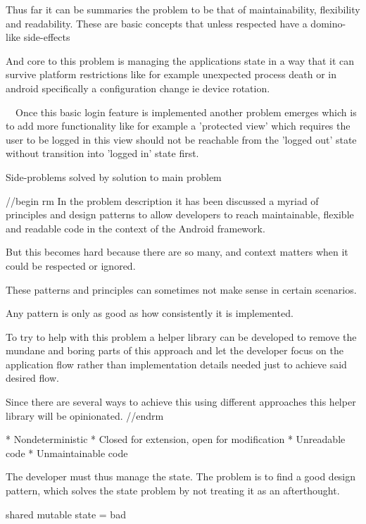 Thus far it can be summaries the problem to be that of maintainability, flexibility and readability.
These are basic concepts that unless respected have a domino-like side-effects 

And core to this problem is managing the applications state in a way that it can survive platform
restrictions like for example unexpected process death or in android specifically a configuration change
ie device rotation.

~~Once this basic login feature is implemented another problem emerges which is to add more functionality
like for example a 'protected view' which requires the user to be logged in 
this view should not be reachable from the 'logged out' state without
transition into 'logged in' state first.~~

Side-problems solved by solution to main problem

//begin rm
In the problem description it has been discussed a myriad of principles and design patterns
to allow developers to reach maintainable, flexible and readable code in the context of the Android framework.

But this becomes hard because there are so many, and context matters when it could be respected or ignored.

These patterns and principles can sometimes not make sense in certain scenarios.

Any pattern is only as good as how consistently it is implemented. 

To try to help with this problem a helper library can be developed to remove the mundane
and boring parts of this approach and let the developer focus on the application flow rather
than implementation details needed just to achieve said desired flow.

Since there are several ways to achieve this using different approaches this helper
library will be opinionated.
//endrm






* Nondeterministic
* Closed for extension, open for modification
* Unreadable code
* Unmaintainable code


The developer must thus manage the state. The problem is to find a good design pattern, which solves the state problem by not treating it as an afterthought. 



shared mutable state = bad
